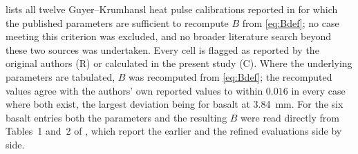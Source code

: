 \documentclass[preprint,12pt,a4paper]{elsarticle}
\theoremstyle{plain}
\theoremstyle{definition}
\theoremstyle{remark}
\newcommand{\Bnum}{B}
\begin{document}
 lists all twelve Guyer--Krumhansl heat pulse
calibrations reported in \cite{Van2017,FeherKovacs2021} for which the
published parameters are sufficient to recompute $\Bnum$ from
\eqref{eq:Bdef}; no case meeting this criterion was excluded, and no
broader literature search beyond these two sources was undertaken. Every cell is flagged as reported by the original authors (R) or
calculated in the present study (C). Where the underlying parameters are
tabulated, $\Bnum$ was recomputed from \eqref{eq:Bdef}; the recomputed values
agree with the authors' own reported values to within $0.016$ in every case
where both exist, the largest deviation being for basalt at
\SI{3.84}{\milli\metre}. For the six basalt entries both the parameters and the
resulting $\Bnum$ were read directly from Tables~1 and~2 of
\cite{FeherKovacs2021}, which report the earlier and the refined evaluations
side by side.
\end{document}

